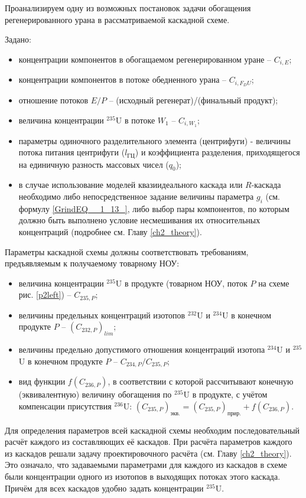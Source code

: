 Проанализируем одну из возможных постановок задачи обогащения регенерированного урана в рассматриваемой каскадной схеме.

Задано:

\begin{itemize}
    \item концентрации компонентов в обогащаемом регенерированном уране -- $C_{i,{E}}$;
    \item концентрации компонентов в потоке обедненного урана -- $C_{i,{F_DU}}$;
    \item отношение потоков $E/P$ -- (исходный регенерат)/(финальный продукт);
    \item величина концентрации $^{235}$U в потоке $W_{1}$ -- $C_{i,{W_1}}$;
    \item параметры одиночного разделительного элемента (центрифуги) - величины потока питания центрифуги ($l_{ГЦ}$) и коэффициента разделения, приходящегося на единичную разность массовых чисел ($q_{0}$);
    \item в случае использование моделей квазиидеального каскада или $R$-каскада необходимо либо непосредственное задание величины параметра $g_i$ (см. формулу \ref{GrindEQ__1_13_}, либо выбор пары компонентов, по которым должно быть выполнено условие несмешивания их относительных концентраций (подробнее см. Главу \ref{ch2_theory}).
\end{itemize}

Параметры каскадной схемы должны соответствовать требованиям, предъявляемым к получаемому товарному НОУ:

\begin{itemize}
    \item величина концентрации $^{235}$U в продукте (товарном НОУ, поток $P$ на схеме рис. \ref{p2left}) -- $C_{235,{P}}$;
    \item величины предельных концентраций изотопов $^{232}$U и $^{234}$U в конечном продукте $P$ -- $(C_{232,{P}})_{lim}$;
    \item величины предельно допустимого отношения концентраций изотопа $^{234}$U и $^{235}$U в конечном продукте $P$ -- ${C_{234,{P}}}/{C_{235,{P}}}$;
    \item вид функции $f(C_{236,P})$, в соответствии с которой рассчитывают конечную (эквивалентную) величину обогащения по $^{235}$U в продукте, с учётом компенсации присутствия $^{236}$U:
    $(C_{235,P})_\textit{экв.}=(C_{235,P})_\textit{прир.}+f(C_{236,P})$.    
\end{itemize}

Для определения параметров всей каскадной схемы необходим последовательный расчёт каждого из составляющих её каскадов. При расчёта параметров каждого из каскадов решали задачу проектировочного расчёта (см. Главу \ref{ch2_theory}). Это означало, что задаваемыми параметрами для каждого из каскадов в схеме были концентрации одного из изотопов в выходящих потоках этого каскада. Причём для всех каскадов удобно задать концентрации $^{235}$U.

